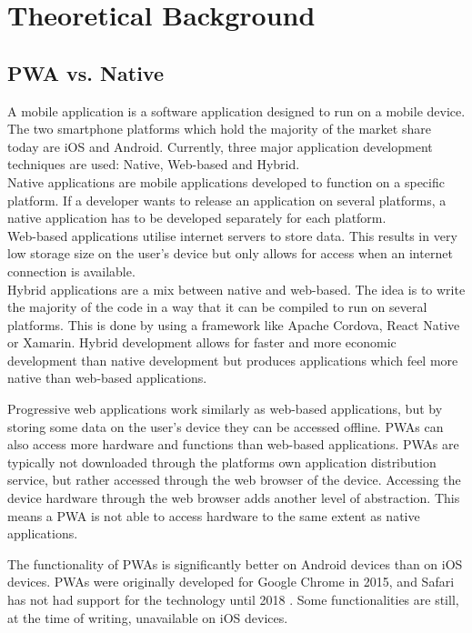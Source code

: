 \section{Theoretical Background}

\subsection{PWA vs. Native}

A mobile application is a software application designed to run on a mobile device. The two smartphone platforms which hold the majority of the market share today are iOS and Android. 
Currently, three major application development techniques are used: Native, Web-based and Hybrid. \\
Native applications are mobile applications developed to function on a specific platform. If a developer wants to release an application on several platforms, a native application has to be developed separately for each platform. \\
Web-based applications utilise internet servers to store data. This results in very low storage size on the user’s device but only allows for access when an internet connection is available. \\
Hybrid applications are a mix between native and web-based. The idea is to write the majority of the code in a way that it can be compiled to run on several platforms. This is done by using a framework like Apache Cordova, React Native or Xamarin. Hybrid development allows for faster and more economic development than native development but produces applications which feel more native than web-based applications.


Progressive web applications work similarly as web-based applications, but by storing some data on the user’s device they can be accessed offline. PWAs can also access more hardware and functions than web-based applications. PWAs are typically not downloaded through the platforms own application distribution service, but rather accessed through the web browser of the device. 
Accessing the device hardware through the web browser adds another level of abstraction. This means a PWA is not able to access hardware to the same extent as native applications. 

The functionality of PWAs is significantly better on Android devices than on iOS devices. PWAs were originally developed for Google Chrome in 2015, and Safari has not had support for the technology until 2018 . Some functionalities are still, at the time of writing, unavailable on iOS devices.
\newline

